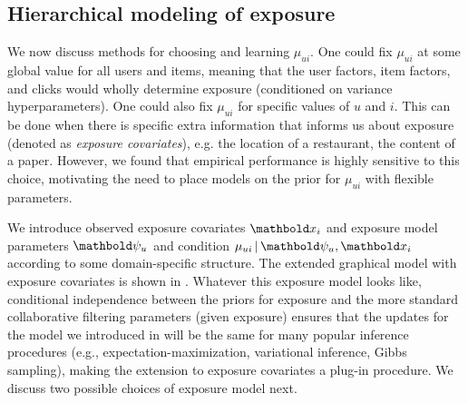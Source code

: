 \subsection{Hierarchical modeling of exposure}
\label{sec:modeling_mu}

We now discuss methods for choosing and learning $\mu_{ui}$. 
One could fix $\mu_{ui}$ 
at some global value for all users and items, 
meaning that the user factors, item factors, and clicks 
would wholly determine exposure (conditioned on variance hyperparameters). 
One could also fix $\mu_{ui}$ for specific values of $u$ and $i$. 
This can be done when there is specific extra information 
that informs us about exposure (denoted as \emph{exposure covariates}), e.g. the location of a restaurant, the content of a paper. 
However, we found that empirical performance is highly sensitive to this choice, 
motivating the need to place models on the prior for $\mu_{ui}$ 
with flexible parameters. 

We introduce observed exposure covariates $\mbx_i$ and exposure model parameters $\mb\psi_{u}$ 
and condition $\mu_{ui} \g \mb{\psi}_{u}, \mb{x}_{i}$ 
according to some domain-specific structure. 
The extended graphical model with exposure covariates 
is shown in . 
Whatever this exposure model looks like, 
conditional independence between the priors for exposure 
and the more standard collaborative filtering parameters (given exposure) 
ensures that the updates for the model we introduced in 
will be the same for many popular inference procedures (e.g., expectation-maximization, variational inference, Gibbs sampling), 
making the extension to exposure covariates a plug-in procedure. 
We discuss two possible choices of exposure model next.

%
%

